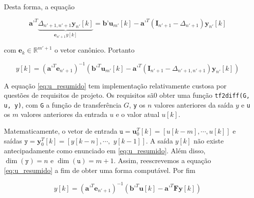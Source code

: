 \documentclass[twoside, fleqn]{article}
\begin{document}
    Desta forma, a equação 
    
        \begin{equation}
            \textbf{a'}^T \underbrace{\Delta_{n' + 1, n' + 1} \textbf{y}_{n'}[k]}_{\textbf{e}_{n'+1} y[k]} = \textbf{b'} \textbf{u}_{m'}[k] - \textbf{a'}^T (\textbf{I}_{n'+1} - \Delta_{n' + 1}) \textbf{y}_{n'}[k]
         \end{equation}
    
    com $\textbf{e}_{k} \in \mathbb{R}^{m'+1}$ o vetor canônico. Portanto
    
        \begin{equation}
            y[k] = \left(\textbf{a'}^T \textbf{e}_{n' + 1}\right)^{-1}\left(\textbf{b'}^T \textbf{u}_{m'}[k] - \textbf{a'}^T (\textbf{I}_{n' + 1} - \Delta_{n' + 1, n' + 1}) \textbf{y}_{n'}[k]\right)
            \label{eq:u_resumido}
        \end{equation}
    
    A equação \eqref{eq:u_resumido} tem implementação relativamente custosa por questões de requisitos de projeto. Os requisitos sã0 obter uma função \texttt{tf2diff(G, u, y)}, com \texttt{G} a função de transferência $G$, \texttt{y} os $n$ valores anteriores da saída $y$ e \texttt{u} os $m$ valores anteriores da entrada $u$ e o valor atual $u[k]$.
    
    Matematicamente, o vetor de entrada $\texttt{u} = \mathbf{u}_0^T[k] = \left[u[k - m], \cdots, u[k]\right]$ e saídas $\texttt{y} = \mathbf{y}_0^T[k] = \left[y[k - n], \cdots,\right.$ $\left.y[k - 1]\right]$. A saída $y[k]$ não existe antecipadamente como enunciado em \eqref{eq:u_resumido}. Além disso, $\dim(\texttt{y}) = n$ e $\dim(\texttt{u}) = m + 1$. Assim, reescrevemos a equação \eqref{eq:u_resumido} a fim de obter uma forma computável. Por fim
    
        \begin{equation}
            y[k] = (\textbf{a'}^T \textbf{e}_{n' + 1})^{-1}(\textbf{b'}^T \textbf{u}[k] - \textbf{a'}^T \textbf{F} \textbf{y}[k])
            \label{eq:u_programacao}
        \end{equation}
    
\end{document}
